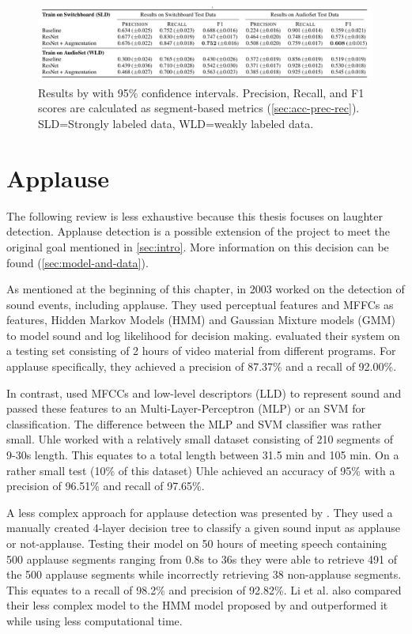 \documentclass[bsc,frontabs,parskip,deptreport]{infthesis}
\begin{document}
\begin{figure}[h!]
    \centering
    \includegraphics[width=14cm]{imgs/results/gillick_et_al.png}
    \caption{Results by \citet{gillick2021robust} with 95\% confidence intervals. Precision, Recall, and F1 scores are calculated as segment-based metrics (\autoref{sec:acc-prec-rec}). SLD=Strongly labeled data, WLD=weakly labeled data.}
    \label{fig:gillick-results}
\end{figure}

\section{Applause}
The following review is less exhaustive because this thesis focuses on laughter detection. Applause detection is a possible extension of the project to meet the original goal mentioned in \autoref{sec:intro}. 
More information on this decision can be found (\autoref{sec:model-and-data}).

As mentioned at the beginning of this chapter, in 2003 \citet{cai2003highlight} worked on the detection of sound events, including applause.
They used perceptual features and MFFCs as features, Hidden Markov Models (HMM) and Gaussian Mixture models (GMM) to model sound and log likelihood for decision making.
\citet{cai2003highlight} evaluated their system on a testing set consisting of 2 hours of video material from different programs.
For applause specifically, they achieved a precision of 87.37\% and a recall of 92.00\%.

In contrast, \citet{uhle2011applause} used MFCCs and low-level descriptors (LLD) to represent sound and passed these features to an Multi-Layer-Perceptron (MLP) or an SVM for classification.
The difference between the MLP and SVM classifier was rather small.
Uhle worked with a relatively small dataset consisting of 210 segments of 9-30s length. This equates to a total length between 31.5 min and 105 min.
On a rather small test (10\% of this dataset) Uhle achieved an accuracy of 95\% with a precision of 96.51\% and recall of 97.65\%.

A less complex approach for applause detection was presented by \citet{li2009characteristics}.
They used a manually created 4-layer decision tree to classify a given sound input as applause or not-applause.
Testing their model on 50 hours of meeting speech containing 500 applause segments ranging from 0.8s to 36s they were able to retrieve 491 of the 500 applause segments while incorrectly retrieving 38 non-applause segments.
This equates to a recall of 98.2\% and precision of 92.82\%. Li et al. also compared their less complex model to the HMM model proposed by \citet{cai2003highlight} and outperformed it while using less computational time.
\end{document}
